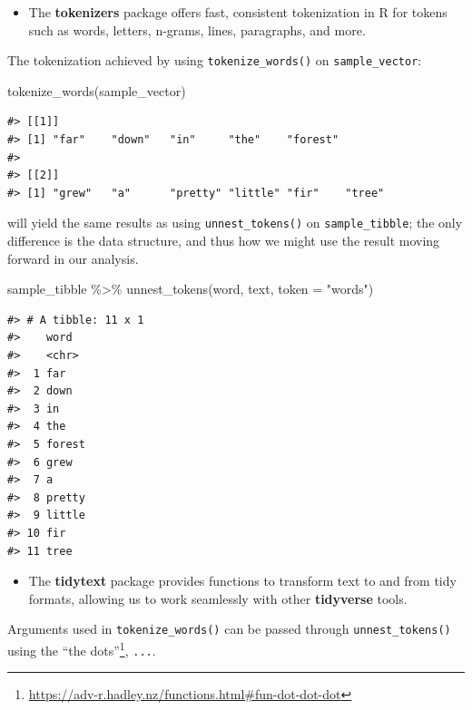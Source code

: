 \documentclass[
]{krantz}
\makeatletter
\newenvironment{Shaded}{\begin{snugshade}}{\end{snugshade}}
\newcommand{\AttributeTok}[1]{\textcolor[rgb]{0.77,0.63,0.00}{#1}}
\newcommand{\FunctionTok}[1]{\textcolor[rgb]{0.00,0.00,0.00}{#1}}
\newcommand{\NormalTok}[1]{#1}
\newcommand{\SpecialCharTok}[1]{\textcolor[rgb]{0.00,0.00,0.00}{#1}}
\newcommand{\StringTok}[1]{\textcolor[rgb]{0.31,0.60,0.02}{#1}}
\DeclareRobustCommand{\href}[2]{#2\footnote{\url{#1}}}
\renewcommand{\href}[2]{#2\footnote{\url{#1}}}
\newenvironment{kframe}{%
\medskip{}
\setlength{\fboxsep}{.8em}
 \def\at@end@of@kframe{}%
 \ifinner\ifhmode%
  \def\at@end@of@kframe{\end{minipage}}%
  \begin{minipage}{\columnwidth}%
 \fi\fi%
 \def\FrameCommand##1{\hskip\@totalleftmargin \hskip-\fboxsep
 \colorbox{shadecolor}{##1}\hskip-\fboxsep
     \hskip-\linewidth \hskip-\@totalleftmargin \hskip\columnwidth}%
 \MakeFramed {\advance\hsize-\width
   \@totalleftmargin\z@ \linewidth\hsize
   \@setminipage}}%
 {\par\unskip\endMakeFramed%
 \at@end@of@kframe}
\renewenvironment{Shaded}{\begin{kframe}}{\end{kframe}}
\newenvironment{rmdblock}[1]
  {\begin{shaded*}
  \begin{itemize}[left = -1cm, labelsep = 1cm]
  \renewcommand{\labelitemi}{
    \raisebox{-.7\height}[0pt][0pt]{
      {\setkeys{Gin}{width=3em,keepaspectratio}\texttt{[image: images/\#1]}}
    }
  }
 
  \item
  }
  {
  \end{itemize}
  \end{shaded*}
  }
\newenvironment{rmdpackage}
  {\begin{rmdblock}{package}}
  {\end{rmdblock}}
\makeatother
\begin{document}
\begin{rmdpackage}
The \textbf{tokenizers} package offers fast, consistent tokenization in
R for tokens such as words, letters, n-grams, lines, paragraphs, and
more.
\end{rmdpackage}

The tokenization achieved by using \texttt{tokenize\_words()} on \texttt{sample\_vector}:

\begin{Shaded}
\begin{Highlighting}[]
\FunctionTok{tokenize\_words}\NormalTok{(sample\_vector)}
\end{Highlighting}
\end{Shaded}

\begin{verbatim}
#> [[1]]
#> [1] "far"    "down"   "in"     "the"    "forest"
#> 
#> [[2]]
#> [1] "grew"   "a"      "pretty" "little" "fir"    "tree"
\end{verbatim}

will yield the same results as using \texttt{unnest\_tokens()} on \texttt{sample\_tibble}; the only difference is the data structure, and thus how we might use the result moving forward in our analysis.

\begin{Shaded}
\begin{Highlighting}[]
\NormalTok{sample\_tibble }\SpecialCharTok{\%\textgreater{}\%}
  \FunctionTok{unnest\_tokens}\NormalTok{(word, text, }\AttributeTok{token =} \StringTok{"words"}\NormalTok{)}
\end{Highlighting}
\end{Shaded}

\begin{verbatim}
#> # A tibble: 11 x 1
#>    word  
#>    <chr> 
#>  1 far   
#>  2 down  
#>  3 in    
#>  4 the   
#>  5 forest
#>  6 grew  
#>  7 a     
#>  8 pretty
#>  9 little
#> 10 fir   
#> 11 tree
\end{verbatim}

\begin{rmdpackage}
The \textbf{tidytext} package provides functions to transform text to
and from tidy formats, allowing us to work seamlessly with other
\textbf{tidyverse} tools.
\end{rmdpackage}

Arguments used in \texttt{tokenize\_words()} can be passed through \texttt{unnest\_tokens()} using the \href{https://adv-r.hadley.nz/functions.html\#fun-dot-dot-dot}{``the dots''}, \texttt{...}.
\end{document}
